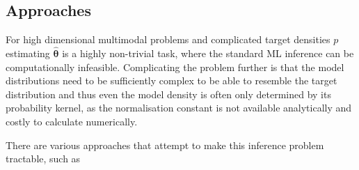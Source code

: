 \subsection{Approaches}
For high dimensional multimodal problems and complicated target densities $p$ estimating $\hat{\bm{\theta}}$ is a highly non-trivial task, 
where the standard ML inference can be computationally infeasible.
Complicating the problem further is that the model distributions need to be sufficiently complex to be able to resemble the target distribution and thus even the model
density is often only determined by its probability kernel, as the normalisation constant is not available analytically and costly to calculate numerically.

There are various approaches that attempt to make this inference problem tractable, such as 

\begin{comment}
\\
Denoising Diffusion Probabilistic Models

\\
Score Matching: 
(Estimation of Non-Normalized Statistical Models by Score Matching, Aapo Hyvarinen 2005)
- always at least locally consistent
-the model pdf needs to be smooth enough

\\
Pseudo-Likelihood Estimation: 
(Besag, Spatial interaction and the statistical analysis of lattice systems. Journal of the Royal Statistical Society, Series B, 36(2):192–236, 1974)
However, the conditional probabilities in (13) are not necessarily readily available and need to be computed. In particular, these conditional densities need to be normalized. The computational burden needed in the normalization is reduced from the original problem since we only need to numerically compute n one-dimensional integrals which is far more feasible than a single n-dimensional integral. However, compared to score matching, this is a computationally expensive method since score matching avoids the need for numerical integration altogether.
The question of consistency of pseudo-likelihood estimation seems to be unclear (in general).

\\
Contrastive Divergence (Hinton Training products of experts by minimizing contrastive divergence. Neural Computation, 14(8):1771–1800, 2002.)
he basic principle is to use an MCMC method for computing the derivative of the logarithm of the normalization factor Z, but the MCMC is allowed to run for only a single iteration (or a few iterations) before doing the gradient step.
- generally biased, even asymptotically
-much more general method than score matching since it is applicable to intractable latent variable models.
-can also handle binary/discrete variables

\end{comment}

